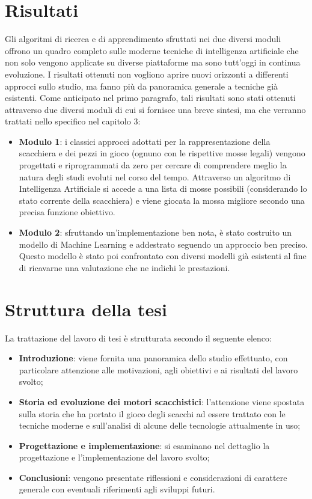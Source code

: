\section{Risultati}
Gli algoritmi di ricerca e di apprendimento sfruttati nei due diversi moduli offrono un quadro completo sulle moderne tecniche di intelligenza
artificiale che non solo vengono applicate su diverse piattaforme ma sono tutt'oggi in continua evoluzione. 
I risultati ottenuti non vogliono aprire nuovi orizzonti a differenti approcci sullo studio, 
ma fanno più da panoramica generale a tecniche già esistenti. Come anticipato nel primo paragrafo, tali risultati sono stati ottenuti attraverso due diversi moduli di cui si fornisce una breve sintesi, ma che verranno trattati nello specifico nel capitolo 3:
\begin{itemize}
    \item \textbf{Modulo 1}: i classici approcci adottati per la rappresentazione della scacchiera e dei pezzi in gioco (ognuno con le rispettive mosse legali) vengono progettati e riprogrammati da zero per cercare di comprendere meglio la natura degli studi evoluti nel corso del tempo. Attraverso un algoritmo di Intelligenza Artificiale si accede a una lista di mosse possibili (considerando lo stato corrente della scacchiera) e viene giocata la mossa migliore secondo una precisa funzione obiettivo.
    \item \textbf{Modulo 2}: sfruttando un'implementazione ben nota, è stato costruito un modello di Machine Learning e addestrato seguendo un approccio ben preciso. Questo modello è stato poi confrontato con diversi modelli già esistenti al fine di ricavarne una valutazione che ne indichi le prestazioni. 
\end{itemize}
\newpage
\section{Struttura della tesi}
La trattazione del lavoro di tesi è strutturata secondo il seguente elenco:
\begin{itemize}
    \item \textbf{Introduzione}: viene fornita una panoramica dello studio effettuato, con particolare attenzione alle motivazioni, 
    agli obiettivi e ai risultati del lavoro svolto;
    \item \textbf{Storia ed evoluzione dei motori scacchistici}: l'attenzione viene spostata sulla 
    storia che ha portato il gioco degli scacchi ad essere trattato con le tecniche moderne e sull'analisi di alcune delle tecnologie attualmente in uso;
    \item \textbf{Progettazione e implementazione}: si esaminano nel dettaglio la progettazione e l'implementazione del lavoro svolto;
    \item \textbf{Conclusioni}: vengono presentate riflessioni e considerazioni di carattere generale con eventuali riferimenti agli sviluppi futuri.
\end{itemize}
